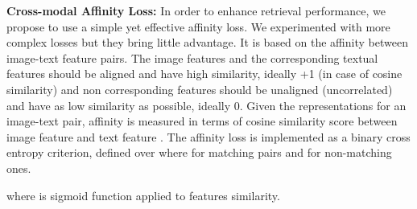 \documentclass[10pt,twocolumn,letterpaper]{article}
\begin{document}
\noindent\textbf{Cross-modal Affinity Loss:}
In order to enhance retrieval performance, we propose to use a simple yet effective affinity loss. We experimented with more complex losses but they bring little advantage. It is based on the affinity between image-text feature pairs. The image features and the corresponding textual features should be aligned and have high similarity, ideally +1 (in case of cosine similarity) and non corresponding features should be unaligned (uncorrelated) and have as low similarity as possible, ideally 0. Given the representations for an image-text pair, affinity is measured in terms of cosine similarity score between image feature  and text feature . The affinity loss is implemented as a binary cross entropy criterion, defined over   where  for matching pairs and  for non-matching ones.
\setlength{\belowdisplayskip}{0pt} \setlength{\belowdisplayshortskip}{0pt}
\setlength{\abovedisplayskip}{0pt} \setlength{\abovedisplayshortskip}{0pt}

where  is sigmoid function applied to features similarity.
\begin{comment}
\begin{table}[]
\centering
\resizebox{\linewidth}{!}{
\begin{tabular}{c||c|c|c}
\hline
Stage & Module              & Vision Output & Textual Output \\ \hline \hline
input & - & 224  224, \ 3 & 1  56, \ 300 \\ \hline
conv1 & \begin{tabular}[c]{@{}c@{}}7  7 conv, stride=2, 3   3 max pool \\ (1  3 conv, stride=1) on text\end{tabular} & 56  56, \ 64 & 1  56, \ 64  \\ \hline
conv2 & AXM block  2 & 28  28, \ 256     &      1  28, \ 256\\ \hline
conv3 & AXM block  2       &  14  14, \ 384 &   1  14, \ 384 \\ \hline
conv4 & AXM block  2       & 14  14, \ 512 &   1  14, \ 512 \\ \hline
conv5 & 1 x 1 conv          & 14  14, \ 512 &   1  14, \ 512 \\ \hline
GAP   & global average pool & 1   1, \  512   & 1   1, \ 512    \\ \hline
\end{tabular}}
\caption{\footnotesize{Architecture of unified feature learning network.}}
\label{architecture}
\end{table}
\end{comment}
\end{document}
